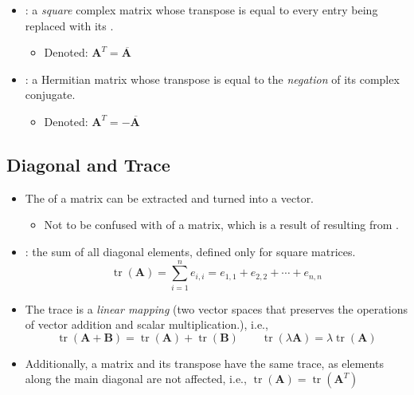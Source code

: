 \begin{itemize}
\begin{itemize}
\begin{itemize}
      \item {}: a \emph{square} complex matrix whose transpose is equal to every entry being replaced with its \hyperref[Complex conjugate]{}. 
        \begin{itemize}
          \item Denoted: \(\bm{A}^T={\overline{\bm{A}\,}}\)
        \end{itemize}
      \item {}: a Hermitian matrix whose transpose is equal to the \emph{negation} of its complex conjugate.
      \begin{itemize}
        \item Denoted: \(\bm{A}^T=-{\overline{\bm{A}\,}}\)
      \end{itemize}
    \end{itemize}
  \end{itemize}

  \subsection{Diagonal and Trace}\label{Diagonal and Trace}
  \begin{itemize}
    \item The \hyperref[Diagonal]{} of a matrix can be extracted and turned into a vector.
      \begin{itemize}
        \item Not to be confused with \hyperref[tbd]{} of a matrix, which is a result of \hyperref[tbd]{} resulting from \hyperref[tbd]{}.
      \end{itemize}
    \item {}: the sum of all diagonal elements, defined only for square matrices.
    \[%
    \operatorname{tr}(\bm{A}) = \sum_{i = 1}^{n} e_{i,i} = e_{1,1} + e_{2,2} + \cdots + e_{n,n}
    \]%
    \item The trace is a \emph{linear mapping} (two vector spaces that preserves the operations of vector addition and scalar multiplication.), i.e.,
    \[%
      \operatorname{tr}(\bm{A + B})  =  \operatorname{tr}(\bm{A}) + \operatorname{tr}(\bm{B})  \qquad
      \operatorname{tr}(\lambda\bm{A}) = \lambda\operatorname{tr}(\bm{A}) 
    \]%
    \item Additionally, a matrix and its transpose have the same trace, as elements along the main diagonal are not affected, i.e., \( \operatorname{tr}(\bm{A}) = \operatorname{tr}(\bm{A}^T)\) 
  \end{itemize}


\end{itemize}
